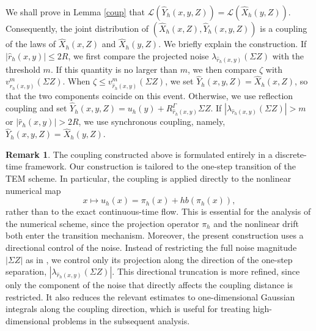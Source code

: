 \documentclass[aap]{imsart}
\theoremstyle{plain}
\theoremstyle{definition}
\newtheorem{remark}{Remark}
\begin{document}
We shall prove in Lemma \ref{coup} that \(\mathcal{L}(\hat Y_h(x,y,Z))=\mathcal{L}(\hat X_h(y,Z))\). Consequently, the joint distribution of \((\hat X_h(x,Z),\hat Y_h(x,y,Z))\) is a coupling of the laws of \(\hat X_h(x,Z)\) and \(\hat X_h(y,Z)\). We briefly explain the construction. If \(|\hat r_h(x,y)|\leqslant 2R\), we
first compare the projected noise \(\lambda_{\hat r_h(x,y)}(\Sigma Z)\) with the threshold \(m\). If this quantity is no larger than \(m\), we then
compare \(\zeta\) with \(v_{\hat r_h(x,y)}^m(\Sigma Z)\). When \(\zeta\leqslant v_{\hat r_h(x,y)}^m(\Sigma Z)\), we set \(\hat Y_h(x,y,Z)=\hat X_h(x,Z)\),
so that the two components coincide on this event.
Otherwise, we use reflection coupling and set \(\hat Y_h(x,y,Z)
=
u_h(y)+R_{\hat r_h(x,y)}^\Gamma \Sigma Z\).
If \(|\lambda_{\hat r_h(x,y)}(\Sigma Z)|>m\) or \(|\hat r_h(x,y)|>2R\),
we use synchronous coupling, namely, \(\hat Y_h(x,y,Z)=\hat X_h(y,Z)\).
\begin{remark}
	The coupling constructed above is formulated entirely in a discrete-time framework. Our construction is tailored to the one-step transition of the TEM scheme. In particular, the coupling is applied directly to the nonlinear numerical map
	\[x\mapsto u_h(x)=\pi_h(x)+h b(\pi_h(x)),\]
	rather than to the exact continuous-time flow. This is essential for the analysis of the numerical scheme, since the projection operator \(\pi_h\) and the nonlinear drift both enter the transition mechanism. Moreover, the present construction uses a directional control of the noise. Instead of restricting the full noise magnitude \(|\Sigma Z|\) as in \cite{Majka}, we control only its projection along the direction of the one-step separation, \(|\lambda_{\hat r_h(x,y)}(\Sigma Z)|\).
	This directional truncation is more refined, since only the component of the noise that directly affects the coupling distance is restricted. It also reduces the relevant estimates to one-dimensional Gaussian integrals along the coupling direction, which is useful for treating high-dimensional problems in the subsequent analysis.
\end{remark}
\end{document}
